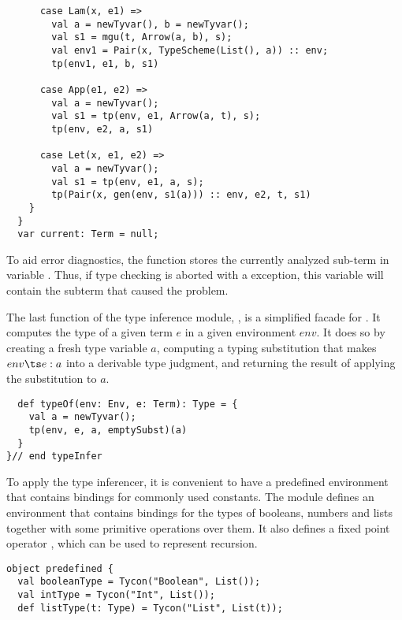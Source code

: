 {\begin{lstlisting}
      case Lam(x, e1) =>
        val a = newTyvar(), b = newTyvar();
        val s1 = mgu(t, Arrow(a, b), s);
        val env1 = Pair(x, TypeScheme(List(), a)) :: env;
        tp(env1, e1, b, s1)

      case App(e1, e2) =>
        val a = newTyvar();
        val s1 = tp(env, e1, Arrow(a, t), s);
        tp(env, e2, a, s1)

      case Let(x, e1, e2) =>
        val a = newTyvar();
        val s1 = tp(env, e1, a, s);
        tp(Pair(x, gen(env, s1(a))) :: env, e2, t, s1)
    }
  } 
  var current: Term = null;
\end{lstlisting}
To aid error diagnostics, the  function stores the currently
analyzed sub-term in variable . Thus, if type checking
is aborted with a  exception, this variable will
contain the subterm that caused the problem.

The last function of the type inference module, , is a
simplified facade for . It computes the type of a given term
$e$ in a given environment $env$. It does so by creating a fresh type
variable $a$, computing a typing substitution that makes $env \ts e: a$
into a derivable type judgment, and returning
the result of applying the substitution to $a$.
\begin{lstlisting}
  def typeOf(env: Env, e: Term): Type = {
    val a = newTyvar();
    tp(env, e, a, emptySubst)(a)
  }
}// end typeInfer
\end{lstlisting}
To apply the type inferencer, it is convenient to have a predefined
environment that contains bindings for commonly used constants. The
module  defines an environment  that
contains bindings for the types of booleans, numbers and lists
together with some primitive operations over them. It also
defines a fixed point operator , which can be used to
represent recursion.
\begin{lstlisting}
object predefined {
  val booleanType = Tycon("Boolean", List());
  val intType = Tycon("Int", List());
  def listType(t: Type) = Tycon("List", List(t));


\end{lstlisting}}
